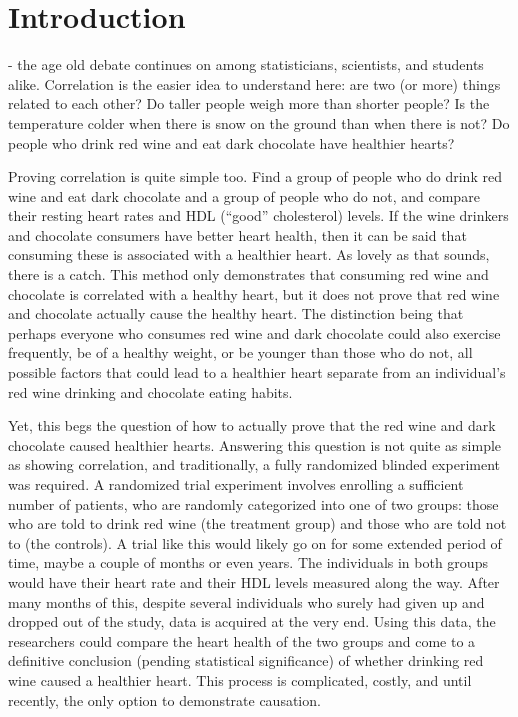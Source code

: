 \chapter{Introduction}
\label{introduction}

 - the age old debate continues on among statisticians, scientists, and students alike.  Correlation is the easier idea to understand here: are two (or more) things related to each other?  Do taller people weigh more than shorter people?  Is the temperature colder when there is snow on the ground than when there is not?  Do people who drink red wine and eat dark chocolate have healthier hearts? 

Proving correlation is quite simple too.  Find a group of people who do drink red wine and eat dark chocolate and a group of people who do not, and compare their resting heart rates and HDL (``good'' cholesterol) levels.  If the wine drinkers and chocolate consumers have better heart health, then it can be said that consuming these is associated with a healthier heart.  As lovely as that sounds, there is a catch.  This method only demonstrates that consuming red wine and chocolate is correlated with a healthy heart, but it does not prove that red wine and chocolate actually cause the healthy heart.  The distinction being that perhaps everyone who consumes red wine and dark chocolate could also exercise frequently,  be of a healthy weight, or be younger than those who do not, all possible factors that could lead to a healthier heart separate from an individual's red wine drinking and chocolate eating habits.  
 
 Yet, this begs the question of how to actually prove that the red wine and dark chocolate caused healthier hearts.  Answering this question is not quite as simple as showing correlation, and traditionally, a fully randomized blinded experiment was required.  A randomized trial experiment involves enrolling a sufficient number of patients, who are randomly categorized into one of two groups: those who are told to drink red wine (the treatment group) and those who are told not to (the controls).  A trial like this would likely go on for some extended period of time, maybe a couple of months or even years.  The individuals in both groups would have their heart rate and their HDL levels measured along the way.  After many months of this, despite several individuals who surely had given up and dropped out of the study, data is acquired at the very end.  Using this data, the researchers could compare the heart health of the two groups and come to a definitive conclusion (pending statistical significance) of whether drinking red wine caused a healthier heart.  This process is complicated, costly, and until recently, the only option to demonstrate causation.  
 

